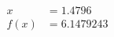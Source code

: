\documentclass[preview]{standalone}
\begin{document}
\begin{align*}
x &= 1.4796\\f(x) &= 6.1479243
\end{align*}
\end{document}
